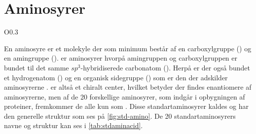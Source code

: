 \section{Aminosyrer}
\begin{wrapfigure}{O}{0.3\linewidth}
	\centering
	\caption{Fischer-projektion af den generelle struktur af .}
	\label{fig:std-amino}
\end{wrapfigure}
En aminosyre er et molekyle der som minimum består af en carboxylgruppe () og en amingruppe ()\footnotemark{}.
 er aminosyrer hvorpå amingruppen og carboxylgruppen er bundet til det samme $sp^3$-hybridiserede carbonatom ().
Herpå er der også bundet et hydrogenatom () og en organisk sidegruppe () som er den der adskilder aminosyrerne \parencite{aminoBrit}.
 er altså et chiralt center,\footnotemark{} hvilket betyder der findes enantiomere af aminosyrerne, men af de 20 forskellige aminosyrer, som indgår i opbygningen af proteiner, fremkommer de alle kun som  \parencite{basisA}.
Disse standartaminosyrer kaldes  og har den generelle struktur som ses på \cref{fig:std-amino}.
De 20 standartaminosyrers navne og struktur kan ses i \cref{tab:stdaminacid}.

